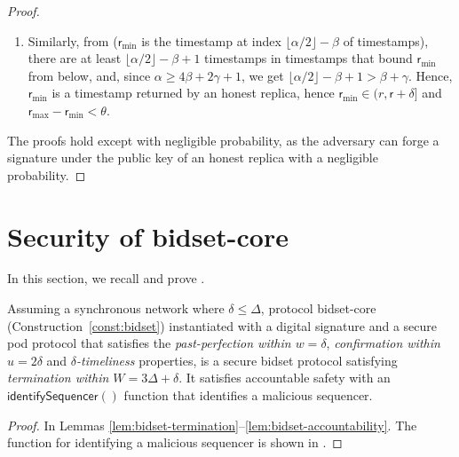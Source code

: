 \documentclass[pdflatex,sn-mathphys-num]{sn-jnl}%
\theoremstyle{thmstyleone}%
\theoremstyle{thmstyletwo}%
\theoremstyle{thmstylethree}%
\newenvironment{customthm}[1]
{\renewcommand\theinnercustomthm{#1}\innercustomthm}
{\endinnercustomthm}
\newtheorem{lemma}{Lemma}
\newcommand{\podtm}{\textsf{pod}\xspace}
\newcommand{\bidsettm}{\textsf{bidset}\xspace}
\newcommand{\operand}[1]{\textsf{#1}}
\newcommand{\round}{\operand{r}\xspace}
\newcommand{\rmin}{\ensuremath{\round_\text{min}}\xspace}
\newcommand{\rmax}{\ensuremath{\round_\text{max}}\xspace}
\newcommand{\txVotes}{\operand{timestamps}\xspace}
\newcommand{\identifySequencer}[1]{\ensuremath{\mathsf{identifySequencer}(#1)}\xspace}
\newcommand{\parConf}{\ensuremath{u}\xspace}
\newcommand{\parPerf}{\ensuremath{w}\xspace}
\newcommand{\parTemp}{\ensuremath{\theta}\xspace}
\newcommand{\parAuctionTerm}{\ensuremath{W}\xspace}
\let\oldalpha\alpha
\renewcommand{\alpha}{\ensuremath{\oldalpha}\xspace}
\let\oldbeta\beta
\renewcommand{\beta}{\ensuremath{\oldbeta}\xspace}
\let\oldgamma\gamma
\renewcommand{\gamma}{\ensuremath{\oldgamma}\xspace}
\newcommand{\tzero}{\ensuremath{t_0}\xspace}
\newcommand{\tone}{\ensuremath{t_1}\xspace}
\newcommand{\ttwo}{\ensuremath{t_2}\xspace}
\newcommand{\tthree}{\ensuremath{t_3}\xspace}
\begin{document}
\begin{appendices}
\begin{proof}
\begin{enumerate}
		\item Similarly, from  (\rmin is the timestamp at index $\lfloor \alpha / 2 \rfloor - \beta$ of \txVotes), there are at least $\lfloor \alpha / 2 \rfloor - \beta + 1$ timestamps in \txVotes that bound \rmin from below, and, since $\alpha \geq 4\beta + 2 \gamma + 1$, we get $\lfloor \alpha / 2 \rfloor - \beta + 1 > \beta + \gamma$.
		Hence, \rmin is a timestamp returned by an honest replica, hence $\rmin \in (r, \round + \delta]$ and $\rmax - \rmin < \parTemp$.
	\end{enumerate}
	The proofs hold except with negligible probability, as the adversary can forge a signature under the public key of an honest replica with a negligible probability.
\end{proof}

\section{Security of \bidsettm-core}\label{app:bidsetsec}



In this section, we recall and prove .

\begin{customthm}{\ref{thm:bidset-construction-secure}}[Bidset security]
    Assuming a synchronous network where $\delta \leq \Delta$,
    protocol \bidsettm-core (Construction~\ref{const:bidset}) instantiated with a digital signature and a secure \podtm protocol that satisfies the \emph{past-perfection within $\parPerf = \delta$}, \emph{confirmation within $\parConf=2\delta$} and \emph{$\delta$-timeliness} properties, is a secure \bidsettm protocol satisfying \emph{termination within $\parAuctionTerm = 3\Delta + \delta$}.
    It satisfies accountable safety with an \identifySequencer{} function that identifies a malicious sequencer.
\end{customthm}
\begin{proof}
	In Lemmas \ref{lem:bidset-termination}--\ref{lem:bidset-accountability}. The function for identifying a malicious sequencer is shown in .
\end{proof}


\end{appendices}
\end{document}

